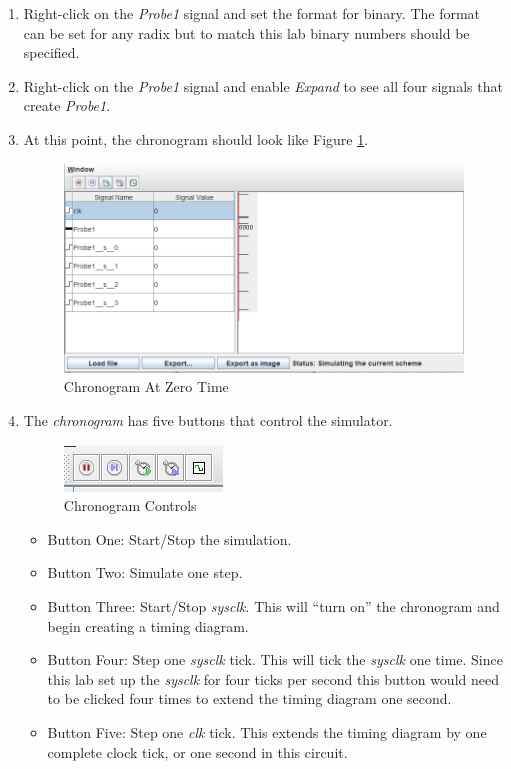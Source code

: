 \begin{enumerate}
	\item Right-click on the \textit{Probe1} signal and set the format for binary. The format can be set for any radix but to match this lab binary numbers should be specified.
	\item Right-click on the \textit{Probe1} signal and enable \textit{Expand} to see all four signals that create \textit{Probe1}.
	\item At this point, the chronogram should look like Figure \ref{fig:count-11}.
	
	\begin{figure}[H]
		\centering
		\includegraphics[width=\maxwidth{.95\linewidth}]{gfx/count-11}
		\caption{Chronogram At Zero Time}
		\label{fig:count-11}
	\end{figure}
	
	\item The \textit{chronogram} has five buttons that control the simulator.
	
	\begin{figure}[H]
		\centering
		\includegraphics[width=\maxwidth{.95\linewidth}]{gfx/count-12}
		\caption{Chronogram Controls}
		\label{fig:count-12}
	\end{figure}
	
	\begin{itemize}
		\item Button One: Start/Stop the simulation.
		\item Button Two: Simulate one step.
		\item Button Three: Start/Stop \textit{sysclk}. This will ``turn on'' the chronogram and begin creating a timing diagram.
		\item Button Four: Step one \textit{sysclk} tick. This will tick the \textit{sysclk} one time. Since this lab set up the \textit{sysclk} for four ticks per second this button would need to be clicked four times to extend the timing diagram one second.
		\item Button Five: Step one \textit{clk} tick. This extends the timing diagram by one complete clock tick, or one second in this circuit.
	\end{itemize}
	

\end{enumerate}
